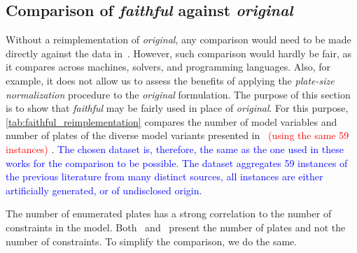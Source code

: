 \documentclass[smallextended]{svjour3}       %
\newif\iffinalversion
\newcommand{\newtext}[1]{\iffinalversion%
#1%
\else%
\textcolor{blue}{#1}%
\fi%
}
\newcommand{\oldtext}[1]{\iffinalversion%
\else%
\textcolor{red}{#1}%
\fi%
}
\begin{document}
\begin{comment}
In \autoref{tab:lp_method_comparison}, \emph{Dual Simplex} and \emph{Barrier} indicate the respective algorithm was used for all LPs and root node relaxations;
and \emph{DS + B} means that \emph{Dual Simplex} was used to solve all LPs inside the pricing phase and \emph{Barrier} was used to solve the root node relaxation of the final model.
The columns \emph{N. P.} (\emph{Not Priced}) and \emph{Priced} display the time to solve (in seconds) using the aforementioned variant.
The columns \emph{R.\%} refer to the per cent of the time spent by \emph{Not Priced} in the root node relaxation of the final model.

The following conclusions can be derived from \autoref{tab:lp_method_comparison}.
Using the \emph{Barrier} algorithm in the pricing phase is not viable.
This impracticality happens because the pricing phase includes an iterative variable pricing phase.
This iterative phase repeatedly adds variables to one LP model and solve it again.
The \emph{Barrier} algorithm solves every LP from scratch;
the \emph{Dual Simplex} reuses the previous basis and saves considerable effort.
However, \emph{Barrier} performs better if there is no previous base to reuse.
Consequently, the configuration chosen was \emph{Dual Simplex} for the pricing phase, and \emph{Barrier} for the root relaxation of the final model.
\end{comment}

\subsection{Comparison of \emph{faithful} against \emph{original}}
\label{sec:faithful_reimplementation}

Without a reimplementation of \emph{original}, any comparison would need to be made directly against the data in~\cite{dimitri_thesis}.
However, such comparison would hardly be fair, as it compares across machines, solvers, and programming languages.
Also, for example, it does not allow us to assess the benefits of applying the \emph{plate-size normalization} procedure to the \emph{original} formulation.
The purpose of this section is to show that \emph{faithful} may be fairly used in place of \emph{original}.
For this purpose, \autoref{tab:faithful_reimplementation} compares the number of model variables and number of plates of the diverse model variants presented in~\cite{furini:2016,dimitri_thesis}\oldtext{(using the same 59 instances)}.
\newtext{The chosen dataset is, therefore, the same as the one used in these works for the comparison to be possible. The dataset aggregates 59 instances of the previous literature from many distinct sources, all instances are either artificially generated, or of undisclosed origin.}
The number of enumerated plates has a strong correlation to the number of constraints in the model.
Both~\cite{furini:2016} and~\cite{dimitri_thesis} present the number of plates and not the number of constraints.
To simplify the comparison, we do the same.
\end{document}
